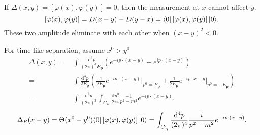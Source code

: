 If $\Delta(x,y)=\left[ \varphi(x),\varphi(y) \right]=0 $, then the measurement at $x$ cannot affect $y$.
\[
  \left[ \varphi(x),\varphi(y) \right] = D(x-y)-D(y-x)=\langle0\rvert\left[ \varphi(x),\varphi(y) \right] \lvert0\rangle	 
.\] 
These two amplitude eliminate with each other when $(x-y)^{2}<0$.

For time like separation, assume $x^0>y^0$
\begin{align*}
  \Delta(x,y)=&\int \frac{\mathrm{d}^3p}{(2\pi)^3E_{\mathbf{p}}}\left( e^{-ip\cdot (x-y)}-e^{ip\cdot (x-y)} \right) \\
  =& \int \frac{\mathrm{d}^3p}{2E_{\mathbf{p}}}\left( \frac{1}{2E_{\mathbf{p}}}e^{-ip\cdot (x-y)}\bigg\lvert_{p^{0}=E_{\mathbf{p}}}+\frac{1}{2E_{\mathbf{p}}}e^{-ip\cdot x-y}\bigg\lvert_{p^{0}=-E_{\mathbf{p}}} \right)\\
      =& \int \frac{\mathrm{d}^3p}{(2\pi)^{3}}\int_{C_R} \frac{\mathrm{d}p^{0}}{2\pi i}\frac{-1}{p^2-m^2}e^{-ip\cdot (x-y)}
.\end{align*}
\[
  \Delta_R(x-y)=\Theta(x^{0}-y^{0})\langle0\rvert\left[ \varphi(x),\varphi(y) \right] \lvert0\rangle= \int_{C_R'} \frac{\mathrm{d}^{4}p}{(2\pi)^{4}}\frac{i}{p^{2}-m^2}e^{-ip\cdot (x-y)}
.\]
